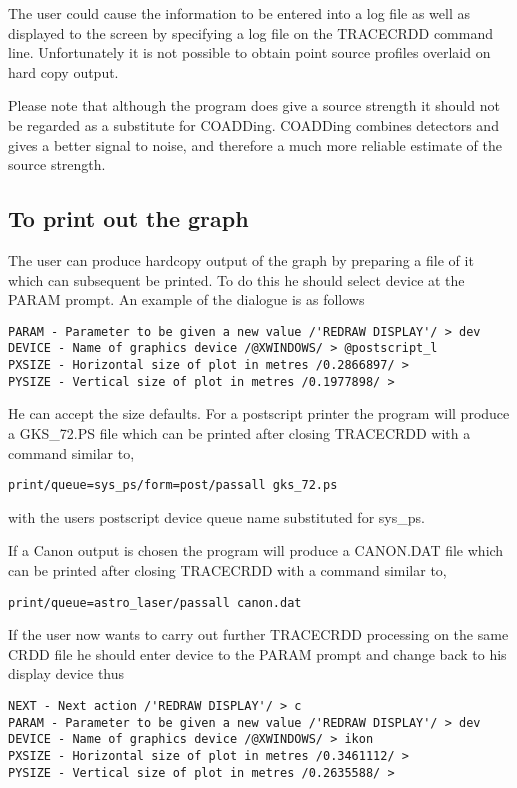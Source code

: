 \documentclass[twoside,11pt]{article}
\begin{document}
The user could cause the information to be entered into a log file as well as
displayed to the screen by specifying a log file on the TRACECRDD command line.
Unfortunately it is not possible to obtain point source profiles overlaid on
hard copy output.

Please note that although the program does give a source strength it should not 
be regarded as a substitute for COADDing. COADDing combines detectors and gives 
a better signal to noise, and therefore a much more reliable estimate of the 
source strength.
\subsection{To print out the graph}
The user can produce hardcopy output of the graph by preparing a file of it
which can subsequent be printed. To do this he should select device at the
PARAM prompt. An example of the dialogue is as follows
\begin{small}
\begin{verbatim}
PARAM - Parameter to be given a new value /'REDRAW DISPLAY'/ > dev
DEVICE - Name of graphics device /@XWINDOWS/ > @postscript_l
PXSIZE - Horizontal size of plot in metres /0.2866897/ > 
PYSIZE - Vertical size of plot in metres /0.1977898/ > 
\end{verbatim}
\end{small}
He can accept the size defaults. For a postscript printer the program will
produce a GKS\_72.PS file which can be printed after closing TRACECRDD with a 
command similar to, 
\begin{small}
\begin{verbatim}
print/queue=sys_ps/form=post/passall gks_72.ps
\end{verbatim}
\end{small}
with the users postscript device queue name substituted for sys\_ps.

If a Canon output is chosen the program will produce a CANON.DAT file which can
be printed after closing TRACECRDD with a command similar to,
\begin{small}
\begin{verbatim}
print/queue=astro_laser/passall canon.dat
\end{verbatim}
\end{small}
If the user now wants to carry out further TRACECRDD processing on the same CRDD
file he should enter device to the PARAM prompt and change back to his display
device thus
\begin{small}
\begin{verbatim}
NEXT - Next action /'REDRAW DISPLAY'/ > c
PARAM - Parameter to be given a new value /'REDRAW DISPLAY'/ > dev
DEVICE - Name of graphics device /@XWINDOWS/ > ikon
PXSIZE - Horizontal size of plot in metres /0.3461112/ > 
PYSIZE - Vertical size of plot in metres /0.2635588/ > 
\end{verbatim}
\end{small}
\end{document}
